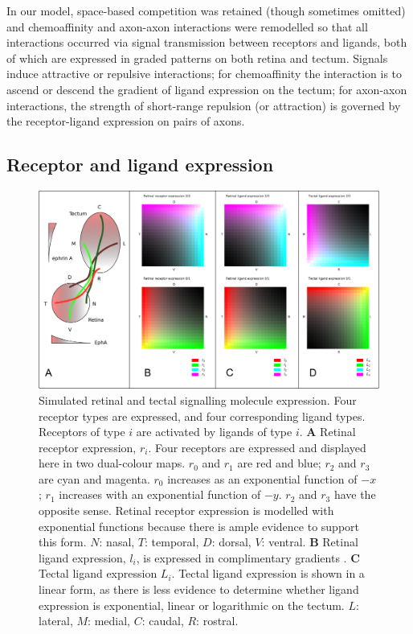 \documentclass[11pt, a4paper]{article}
\begin{document}
In our model, space-based competition was retained (though sometimes omitted)
and chemoaffinity and axon-axon interactions were remodelled so that all
interactions occurred via signal transmission between receptors and ligands,
both of which are expressed in graded patterns on both retina and
tectum. Signals induce attractive or repulsive interactions; for chemoaffinity
the interaction is to ascend or descend the gradient of ligand expression on
the tectum; for axon-axon interactions, the strength of short-range repulsion
(or attraction) is governed by the receptor-ligand expression on pairs of
axons.

\subsection*{Receptor and ligand expression}

\begin{figure}
\includegraphics[width=\linewidth]{./images/expressions_fig.png}
\caption{Simulated retinal and tectal signalling molecule expression. Four
receptor types are expressed, and four corresponding ligand types. Receptors
of type $i$ are activated by ligands of type $i$.
%
\textbf{A} Retinal receptor expression, $r_i$. Four receptors are expressed and
displayed here in two dual-colour maps. $r_0$ and $r_1$ are red and blue;
$r_2$ and $r_3$ are cyan and magenta. $r_0$ increases as an exponential
function of $-x$; $r_1$ increases with an exponential function of $-y$. $r_2$
and $r_3$ have the opposite sense. Retinal receptor expression is modelled
with exponential functions because there is ample evidence to support this
form. $N$: nasal, $T$: temporal, $D$: dorsal, $V$: ventral.
%
\textbf{B} Retinal ligand expression, $l_i$, is expressed in complimentary
gradients \citep{hornberger_modulation_1999}.
%
\textbf{C} Tectal ligand expression $L_i$. Tectal ligand expression is shown in a linear form,
as there is less evidence to determine whether ligand expression is
exponential, linear or logarithmic on the tectum.
$L$: lateral, $M$: medial, $C$: caudal, $R$: rostral.
}
\label{f:ex}
\end{figure}
\end{document}
